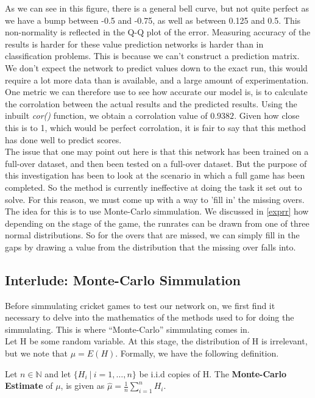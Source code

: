 As we can see in this figure, there is a general bell curve, but not quite perfect as we have a bump between -0.5 and -0.75, as well as between 0.125 and 0.5. This 
non-normality is reflected in the Q-Q plot of the error. Measuring accuracy of the results is harder for these value prediction networks is harder than in classification 
problems. This is because we can't construct a prediction matrix. We don't expect the network to predict values down to the exact run, this would require a lot more 
data than is available, and a large amount of experimentation. One metric we can therefore use to see how accurate our model is, is to calculate 
the corrolation between the actual results and the predicted results. Using the inbuilt \textit{cor()} function, we obtain a corrolation value of 
$0.9382$. Given how close this is to 1, which would be perfect corrolation, it is fair to say that this method has done well to predict scores. \\

The issue that one may point out here is that this network has been trained on a full-over dataset, and then been tested on a full-over dataset. But the purpose of this 
investigation has been to look at the scenario in which a full game has been completed. So the method is currently ineffective at doing the task it set out to solve. For this reason,
we must come up with a way to 'fill in' the missing overs. The idea for this is to use Monte-Carlo simmulation. We discussed in \ref{exprr} how depending on the stage of the game,
the runrates can be drawn from one of three normal distributions. So for the overs that are missed, we can simply fill in the gaps by drawing a value from the distribution that the missing over falls 
into. 

\subsection{Interlude: Monte-Carlo Simmulation}
Before simmulating cricket games to test our network on, we first find it necessary to delve into the mathematics of the methods used to for doing the simmulating. This is where
``Monte-Carlo'' simmulating comes in. \\
Let H be some random variable. At this stage, the distribution of H is irrelevant, but we note that $\mu = E(H)$. Formally, we have the following definition.

\begin{definition}
    Let $n \in \mathbb{N}$ and let $\{H_i \ | \ i =1,\ldots,n\}$ be i.i.d copies of H. The \textbf{Monte-Carlo Estimate} of $\mu$, is given as $\hat{\mu}=\frac{1}{n}\sum_{i=1}^n H_i$.  
\end{definition}

